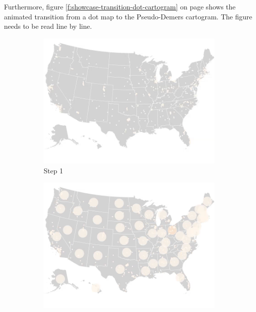 Furthermore, figure \ref{f:showcase-transition-dot-cartogram} on page \pageref{f:showcase-transition-dot-cartogram} shows the animated transition from a dot map to the Pseudo-Demers cartogram. The figure needs to be read line by line.

\begin{figure}
    \centering

    \begin{subfigure}[b]{0.31\textwidth}
        \centering
        \includegraphics[width=\textwidth]{images/results/dot_cartogram/transition_1.png}
        \caption[]%
        {{\small Step 1}}
    \end{subfigure}
    \hfill
    \begin{subfigure}[b]{0.31\textwidth}
        \centering
        \includegraphics[width=\textwidth]{images/results/dot_cartogram/transition_2.png}

\end{subfigure}
\end{figure}
